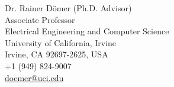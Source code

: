 

%
%


Dr. Rainer D\"{o}mer (Ph.D. Advisor) \\
Associate Professor\\
Electrical Engineering and Computer Science\\
University of California, Irvine\\
Irvine, CA 92697-2625, USA\\
+1 (949) 824-9007\\
\href{mailto:doemer@uci.edu}{doemer@uci.edu}\\

\begin{comment}
\vspace{5mm}

Prof. Dr. Wolfgang Rosenstiel \\
Professor				\\
Wilhelm Schickard Institute of Computer Science \\
Department of Computer Engineering \\
University of T\"ubingen \\
Sand 13 \\
72076 T\"ubingen, Germany \\
+49 (0)7071 29 78956 \\
\href{mailto:rosenstiel@informatik.uni-tuebingen.de}{rosenstiel@informatik.uni-tuebingen.de}\\


\vspace{5mm}

Dr. Daniel Gajski (Dissertation Committee)\\
Professor, Director\\
Center for Embedded Computer Systems\\
University of California, Irvine\\
+1 (949) 824-4155\\
\href{mailto:gajski@uci.edu}{gajski@uci.edu}\\
\end{comment}

